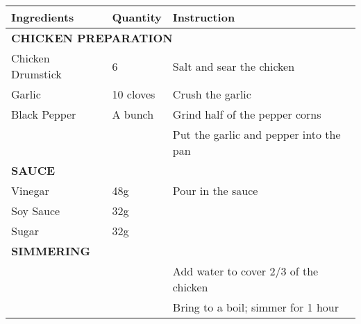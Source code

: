 \documentclass{article}
\newcommand{\tabletitle}[1]{\midrule\multicolumn{3}{l}{\textbf{\color{BrickRed} \MakeUppercase{#1}}}}
\begin{document}
\begin{tabular}{lll} \toprule
  \textbf{Ingredients} & \textbf{Quantity} & \textbf{Instruction}                   \\
  \tabletitle{Chicken Preparation}                                                  \\
  Chicken Drumstick    & 6                 & Salt and sear the chicken              \\
  Garlic               & 10 cloves         & Crush the garlic                       \\
  Black Pepper         & A bunch           & Grind half of the pepper corns         \\
                       &                   & Put the garlic and pepper into the pan \\
  \tabletitle{Sauce}                                                                \\
  Vinegar              & 48g               & Pour in the sauce                                           \\
  Soy Sauce            & 32g               &                                        \\
  Sugar                & 32g               &                                        \\
  \tabletitle{Simmering}                                                            \\
                       &                   & Add water to cover 2/3 of the chicken  \\
                       &                   & Bring to a boil; simmer for 1 hour     \\
  \bottomrule
\end{tabular}
\end{document}
